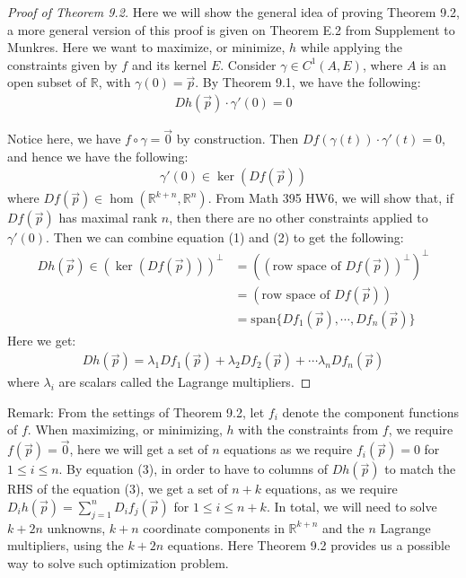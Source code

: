 \documentclass[15pt]{book}
\theoremstyle{break}
\theoremstyle{break}
\newcommand{\R}{\mathbb{R}}
\newcommand{\spa}{\text{span}}
\newcommand{\remark}{\color{blue}Remark: \color{black}}
\begin{document}
\begin{proof}[Proof of Theorem 9.2]
Here we will show the general idea of proving Theorem 9.2, a more general version of this proof is given on Theorem E.2 from Supplement to Munkres. Here we want to maximize, or minimize, $h$ while applying the constraints given by $f$ and its kernel $E$. Consider $\gamma \in C^1(A,E)$, where $A $ is an open subset of $\R$, with $\gamma(0) = \vec{p}$. By Theorem 9.1, we have the following:
\begin{align*}
Dh(\vec{p}) \cdot \gamma' (0) = 0 \tag{1}
\end{align*}

Notice here, we have $f\circ \gamma = \vec{0}$ by construction. Then $Df(\gamma(t)) \cdot \gamma' (t) = 0$, and hence we have the following:
\begin{align*}
\gamma'(0) \in \ker(Df(\vec{p})) \tag{2}
\end{align*}
where $Df(\vec{p}) \in \hom(\R^{k+n},\R^n)$. From Math 395 HW6, we will show that, if $Df(\vec{p})$ has maximal rank $n$, then there are no other constraints applied to $\gamma'(0)$. Then we can combine equation (1) and (2) to get the following: 
\begin{align*}
Dh(\vec{p}) \in (\ker(Df(\vec{p})))^\perp &= ((\text{row space of }Df(\vec{p}))^\perp)^\perp \\&= (\text{row space of }Df(\vec{p})) \\&= \spa\{Df_1(\vec{p}),\cdots, Df_n(\vec{p})\}
\end{align*}
Here we get: 
\begin{align*}
Dh(\vec{p}) = \lambda_1 Df_1(\vec{p})+ \lambda_2 Df_2(\vec{p}) + \cdots \lambda_n Df_n(\vec{p}) \tag{3}
\end{align*}
where $\lambda_i$ are scalars called the Lagrange multipliers.
\end{proof}

\remark From the settings of Theorem 9.2, let $f_i$ denote the component functions of $f$. When maximizing, or minimizing, $h$ with the constraints from $f$, we require $f(\vec{p}) = \vec{0}$, here we will get a set of $n$ equations as we require $f_i(\vec{p}) = 0$ for $1\leq i \leq n$. By equation (3), in order to have to columns of $Dh(\vec{p})$ to match the RHS of the equation (3), we get a set of $n+k$ equations, as we require $D_ih(\vec{p}) = \sum_{j=1}^n D_if_j(\vec{p})$ for $1\leq i \leq n+k$. In total, we will need to solve $k+2n$ unknowns, $k+n$ coordinate components in $\R^{k+n}$ and the $n$ Lagrange multipliers, using the $k+2n$ equations. Here Theorem 9.2 provides us a possible way to solve such optimization problem.\\
\end{document}
